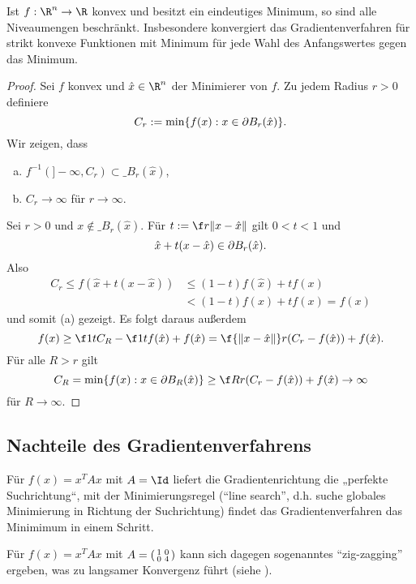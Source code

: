 \begin{st}[Röhm] \label{2.27}
	Ist $f: \R^n \to \R$ konvex und besitzt ein eindeutiges Minimum, so sind alle Niveaumengen beschränkt.
	Insbesondere konvergiert das Gradientenverfahren für strikt konvexe Funktionen mit Minimum für jede Wahl des Anfangswertes gegen das Minimum.
	\begin{proof}
		Sei $f$ konvex und $\hat x \in \R^n$ der Minimierer von $f$.
		Zu jedem Radius $r > 0$ definiere
		\[
			C_r := \min \{ f(x) : x \in \partial B_r (\hat x) \}.
		\]
		Wir zeigen, dass
		\begin{enumerate}[(a)]
			\item
				$f^{-1}(]-\infty, C_r) \subset \_{B_r(\hat x)}$,
			\item
				$C_r \to \infty$ für $r \to \infty$.
		\end{enumerate}
		Sei $r > 0$ und $x \not\in \_{B_r(\hat x)}$.
		Für $t := \f r{\|x - \hat x\|}$ gilt $0 < t < 1$ und
		\[
			\hat x + t(x-\hat x) \in \partial B_r(\hat x).
		\]
		Also
		\begin{align*}
			C_r
			\le f(\hat x + t(x-\hat x))
			&\le (1-t) f(\hat x) + tf(x) \\
			&< (1-t) f(x) + t f(x)
			= f(x)
		\end{align*}
		und somit (a) gezeigt.
		Es folgt daraus außerdem
		\[
			f(x)
			\ge \f 1t C_R - \f 1t f(\hat x) + f(\hat x)
			= \f {\|x-\hat x\|}r (C_r - f(\hat x)) + f(\hat x).
		\]
		Für alle $R > r$ gilt
		\[
			C_R = \min \{ f(x) : x \in \boundary B_R(\hat x) \}
			\ge \f Rr (C_r - f(\hat x)) + f(\hat x)
			\to \infty
		\]
		für $R \to \infty$.
	\end{proof}
\end{st}

\subsection{Nachteile des Gradientenverfahrens}

Für $f(x) = x^T A x$ mit $A = \Id$ liefert die Gradientenrichtung die „perfekte Suchrichtung“, mit der Minimierungsregel (“line search”, d.h. suche globales Minimierung in Richtung der Suchrichtung) findet das Gradientenverfahren das Minimimum in einem Schritt.

Für $f(x) = x^T A x$ mit $A = \begin{psmallmatrix}1 & 0 \\ 0 & 4\end{psmallmatrix}$ kann sich dagegen sogenanntes “zig-zagging” ergeben, was zu langsamer Konvergenz führt (siehe ).


